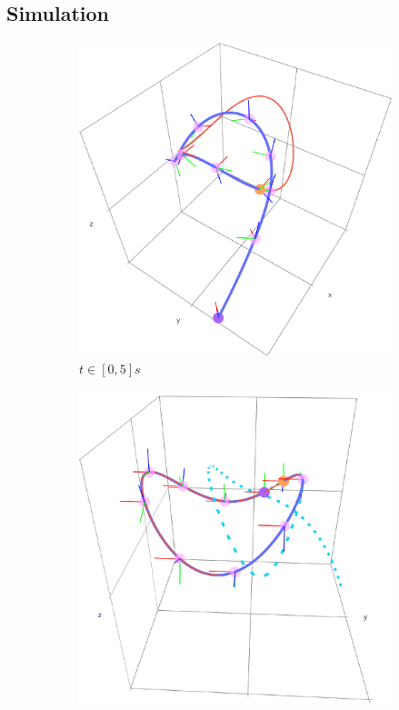 \subsection{Simulation}
\begin{figure}[ht!]
    \centering
    \begin{subfigure}[b]{0.32\textwidth}
        \centering
        \includegraphics[width=\textwidth]{figures/vf_automatica_1.pdf} %
        \caption{$t\in[0, 5]s$}
        \label{fig:vfplot-first}
    \end{subfigure}
    \hfill
    \begin{subfigure}[b]{0.32\textwidth}
        \centering
        \includegraphics[width=\textwidth]{figures/vf_automatica_2.pdf} %

\end{subfigure}
\end{figure}
